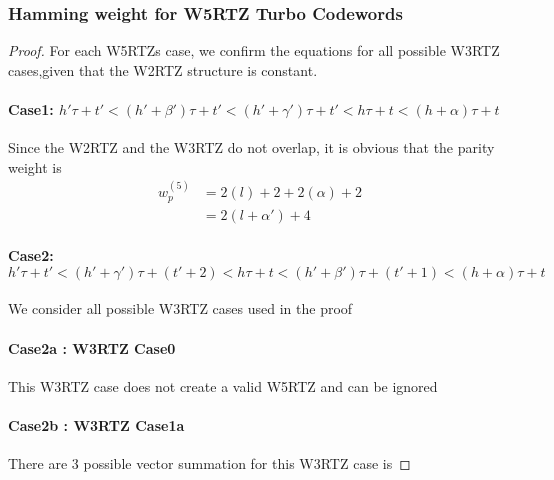 \subsubsection{Hamming weight for W5RTZ Turbo Codewords}
\begin{proof}
For each W5RTZs case, we confirm the equations for all possible W3RTZ cases,given that the W2RTZ structure is constant.
\paragraph{Case1: $h'\tau+t'<(h'+\beta')\tau+t'<(h'+\gamma')\tau+t'<h\tau+t<(h+\alpha)\tau+t$ \newline}
Since the W2RTZ and the W3RTZ do not overlap, it is obvious that the 
parity weight is
\begin{equation*}
\begin{split}
w_p^{(5)}&=2(l)+2+2(\alpha)+2\\
&=2(l+\alpha')+4
\end{split}
\end{equation*}

\newpage
\paragraph{Case2: $h'\tau+t'<(h'+\gamma')\tau+(t'+2)<h\tau+t<(h'+\beta')\tau+(t'+1)<(h+\alpha)\tau+t$ \newline}
We consider all  possible W3RTZ cases used in the proof

\paragraph{Case2a : W3RTZ Case0 \newline}
This W3RTZ case does not create a valid W5RTZ and can be ignored

\paragraph{Case2b : W3RTZ Case1a}
There are 3 possible vector summation for this W3RTZ case is

\end{proof}
